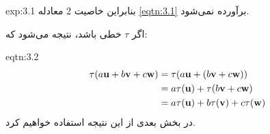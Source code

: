 {\begin{spacing}{1.5}
\begin{example}{exp:3.1}
            بنابراین خاصیت 2 معادله \ref{eqtn:3.1} برآورده نمی‌شود.
        \end{example}

        اگر $\tau$ خطی باشد، نتیجه می‌شود که:
        \begin{eqtn}{eqtn:3.2}
            \begin{equation*}
                \centering
                \begin{split}
                    \tau(a\textbf{u}+b\textbf{v}+c\textbf{w})&=\tau(a\textbf{u}+(b\textbf{v}+c\textbf{w})) \\
                    &=a\tau(\textbf{u})+\tau(b\textbf{v}+c\textbf{w})\\
                    &=a\tau(\textbf{u})+b\tau(\textbf{v})+c\tau(\textbf{w})
                \end{split}
            \end{equation*}
            در بخش بعدی از این نتیجه استفاده خواهیم کرد.
        \end{eqtn}
    \end{spacing}
}

